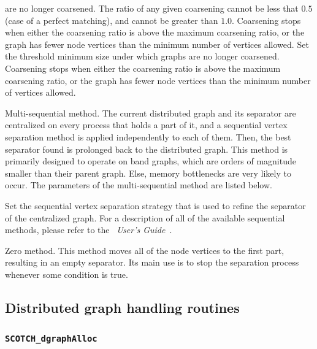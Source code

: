 \begin{itemize}
\begin{itemize}
\begin{itemize}
are no longer coarsened. The ratio of any given coarsening cannot be
less that $0.5$ (case of a perfect matching), and cannot be greater
than $1.0$. Coarsening stops when either the coarsening ratio is
above the maximum coarsening ratio, or the graph
has fewer node vertices than the minimum number of vertices allowed.
\iteme[{\tt vert=}{\it nbr}]
Set the threshold minimum size under which graphs
are no longer coarsened. Coarsening stops when either the coarsening
ratio is above the maximum coarsening ratio, or the graph
has fewer node vertices than the minimum number of vertices allowed.
\end{itemize}
\iteme[{\tt q}]
Multi-sequential method. The current distributed graph and its
separator are centralized on every process that holds a part of it, and
a sequential vertex separation method is applied independently to each
of them. Then, the best separator found is prolonged back to the
distributed graph. This method is primarily designed to operate on
band graphs, which are orders of magnitude smaller than their parent
graph. Else, memory bottlenecks are very likely to occur.
The parameters of the multi-sequential method are listed below.
\begin{itemize}
\iteme[{\tt strat=}{\it strat}]
Set the sequential vertex separation strategy that is used to refine
the separator of the centralized graph. For a description of all of
the available sequential methods, please refer to the
{\it\scotch\ User's Guide}~\scotchcitesuser.
\end{itemize}
\iteme[{\tt z}]
Zero method. This method moves all of the node vertices to the first
part, resulting in an empty separator. Its main use is to stop the
separation process whenever some condition is true.
\end{itemize}
\end{itemize}

\subsection{Distributed graph handling routines}
\label{sec-lib-func-dgraph}

\subsubsection{{\tt SCOTCH\_dgraphAlloc}}

